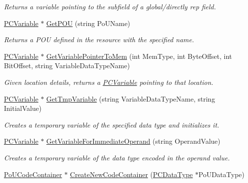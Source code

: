 \begin{DoxyCompactItemize}
\begin{DoxyCompactList}\small\item\em Returns a variable pointing to the subfield of a global/directly rep field. \end{DoxyCompactList}\item 
\hyperlink{classpc__emulator_1_1PCVariable}{P\+C\+Variable} $\ast$ \hyperlink{classpc__emulator_1_1PCResourceImpl_ad77764d5bda087274d6ab8a2bcf8c649}{Get\+P\+OU} (string Po\+U\+Name)
\begin{DoxyCompactList}\small\item\em Returns a P\+OU defined in the resource with the specified name. \end{DoxyCompactList}\item 
\hyperlink{classpc__emulator_1_1PCVariable}{P\+C\+Variable} $\ast$ \hyperlink{classpc__emulator_1_1PCResourceImpl_a0d071f95da611671930d5554c7c72e8b}{Get\+Variable\+Pointer\+To\+Mem} (int Mem\+Type, int Byte\+Offset, int Bit\+Offset, string Variable\+Data\+Type\+Name)
\begin{DoxyCompactList}\small\item\em Given location details, returns a \hyperlink{classpc__emulator_1_1PCVariable}{P\+C\+Variable} pointing to that location. \end{DoxyCompactList}\item 
\hyperlink{classpc__emulator_1_1PCVariable}{P\+C\+Variable} $\ast$ \hyperlink{classpc__emulator_1_1PCResourceImpl_ab55fc0e3ceb026fc93641f5feb0e2efc}{Get\+Tmp\+Variable} (string Variable\+Data\+Type\+Name, string Initial\+Value)
\begin{DoxyCompactList}\small\item\em Creates a temporary variable of the specified data type and initializes it. \end{DoxyCompactList}\item 
\hyperlink{classpc__emulator_1_1PCVariable}{P\+C\+Variable} $\ast$ \hyperlink{classpc__emulator_1_1PCResourceImpl_a698386af76ea94866178eda4e8bbefb9}{Get\+Variable\+For\+Immediate\+Operand} (string Operand\+Value)
\begin{DoxyCompactList}\small\item\em Creates a temporary variable of the data type encoded in the operand value. \end{DoxyCompactList}\item 
\hyperlink{classpc__emulator_1_1PoUCodeContainer}{Po\+U\+Code\+Container} $\ast$ \hyperlink{classpc__emulator_1_1PCResourceImpl_a0f9f8987a73c02f24f8b038c2b3f1cdd}{Create\+New\+Code\+Container} (\hyperlink{classpc__emulator_1_1PCDataType}{P\+C\+Data\+Type} $\ast$Po\+U\+Data\+Type)\hypertarget{classpc__emulator_1_1PCResourceImpl_a0f9f8987a73c02f24f8b038c2b3f1cdd}{}\label{classpc__emulator_1_1PCResourceImpl_a0f9f8987a73c02f24f8b038c2b3f1cdd}


\end{DoxyCompactItemize}
